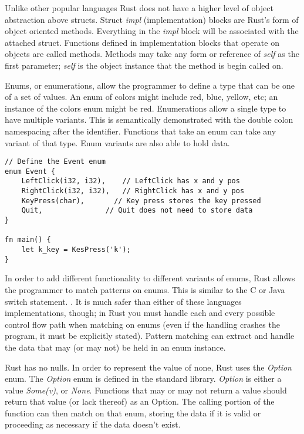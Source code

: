 \documentclass[12pt]{article}
\begin{document}
\begin{flushleft}
Unlike other popular languages Rust does not have a higher level of object
abstraction above structs. Struct \textit{impl} (implementation) blocks are
Rust's form of object oriented methods. Everything in the \textit{impl} block
will be associated with the attached struct. Functions defined in
implementation blocks that operate on objects are called methods. Methods may
take any form or reference of \textit{self} as the first parameter;
\textit{self} is the object instance that the method is begin called on.

Enums, or enumerations, allow the programmer to define a type that can be one
of a set of values. An enum of colors might include red, blue, yellow, etc; an
instance of the colors enum might be red. Enumerations allow a single type to
have multiple variants. This is semantically demonstrated with the double colon
namespacing after the identifier. Functions that take an enum can take any
variant of that type. Enum variants are also able to hold data.

\singlespacing{}
\begin{verbatim}
// Define the Event enum
enum Event {
    LeftClick(i32, i32),    // LeftClick has x and y pos
    RightClick(i32, i32),   // RightClick has x and y pos
    KeyPress(char),       // Key press stores the key pressed
    Quit,               // Quit does not need to store data
}

fn main() {
    let k_key = KesPress('k');
}
\end{verbatim}
\doublespacing{}

In order to add different functionality to different variants of enums, Rust
allows the programmer to match patterns on enums. This is similar to the C or
Java switch statement. \textit{\cite{the-c-programming-language}}. It is much safer than
either of these languages implementations, though; in Rust you must handle each
and every possible control flow path when matching on enums (even if the
handling crashes the program, it must be explicitly stated). Pattern matching
can extract and handle the data that may (or may not) be held in an enum
instance.

Rust has no nulls. In order to represent the value of none, Rust uses the
\textit{Option} enum. The \textit{Option} enum is defined in the standard
library. \textit{Option} is either a value \textit{Some(v)}, or \textit{None}.
Functions that may or may not return a value should return that value (or lack
thereof) as an Option. The calling portion of the function can then match on
that enum, storing the data if it is valid or proceeding as necessary if the
data doesn't exist.


\end{flushleft}
\end{document}

